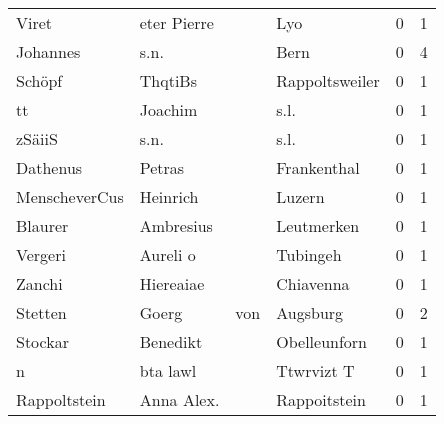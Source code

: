 \begin{center}
\begin{tiny}
\begin{longtabu}{llllrr}
                    Viret &                        eter Pierre &             &                                         Lyo &          0 &         1 \\
                 Johannes &                               s.n. &             &                                        Bern &          0 &         4 \\
                   Schöpf &                            ThqtiBs &             &                              Rappoltsweiler &          0 &         1 \\
                       tt &                            Joachim &             &                                        s.l. &          0 &         1 \\
                   zSäiiS &                               s.n. &             &                                        s.l. &          0 &         1 \\
                 Dathenus &                             Petras &             &                                 Frankenthal &          0 &         1 \\
            MenscheverCus &                           Heinrich &             &                                      Luzern &          0 &         1 \\
                  Blaurer &                          Ambresius &             &                                  Leutmerken &          0 &         1 \\
                  Vergeri &                           Aureli o &             &                                    Tubingeh &          0 &         1 \\
                   Zanchi &                          Hiereaiae &             &                                   Chiavenna &          0 &         1 \\
                  Stetten &                              Goerg &         von &                                    Augsburg &          0 &         2 \\
                  Stockar &                           Benedikt &             &                                Obelleunforn &          0 &         1 \\
                        n &                           bta lawl &             &                                  Ttwrvizt T &          0 &         1 \\
             Rappoltstein &                         Anna Alex. &             &                                Rappoitstein &          0 &         1 \\

\end{longtabu}
\end{tiny}
\end{center}
